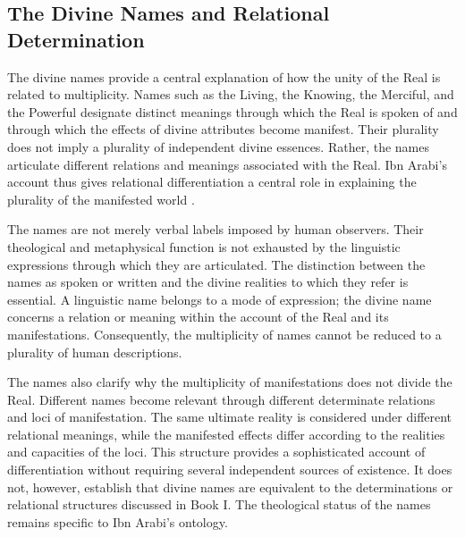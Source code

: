 
\subsection{The Divine Names and Relational Determination}
\label{subsec:ch08_s16_ss06}

\label{para:VS.B01.P01.C08.S16.SS06.P001}

The divine names provide a central explanation of how
the unity of the Real is related to multiplicity.
Names such as the Living, the Knowing, the Merciful,
and the Powerful designate distinct meanings through
which the Real is spoken of and through which the
effects of divine attributes become manifest. Their
plurality does not imply a plurality of independent
divine essences. Rather, the names articulate different
relations and meanings associated with the Real.
Ibn Arabi's account thus gives relational differentiation
a central role in explaining the plurality of the
manifested world \citep{ChittickSufiPathKnowledge1989}.

\label{para:VS.B01.P01.C08.SS06.P002}

The names are not merely verbal labels imposed by
human observers. Their theological and metaphysical
function is not exhausted by the linguistic expressions
through which they are articulated. The distinction
between the names as spoken or written and the divine
realities to which they refer is essential. A linguistic
name belongs to a mode of expression; the divine name
concerns a relation or meaning within the account of
the Real and its manifestations. Consequently, the
multiplicity of names cannot be reduced to a plurality
of human descriptions.

\label{para:VS.B01.P01.C08.SS06.P003}

The names also clarify why the multiplicity of
manifestations does not divide the Real. Different
names become relevant through different determinate
relations and loci of manifestation. The same ultimate
reality is considered under different relational
meanings, while the manifested effects differ according
to the realities and capacities of the loci. This
structure provides a sophisticated account of
differentiation without requiring several independent
sources of existence. It does not, however, establish
that divine names are equivalent to the determinations
or relational structures discussed in Book I. The
theological status of the names remains specific to
Ibn Arabi's ontology.


